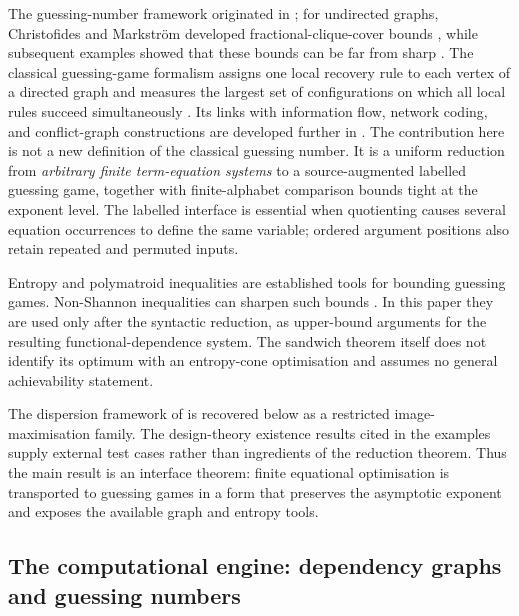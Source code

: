 \documentclass[11pt]{article}
\theoremstyle{plain}
\theoremstyle{definition}
\theoremstyle{definition}
\theoremstyle{remark}
\begin{document}
The guessing-number framework originated in \cite{riis2007information}; for undirected graphs,
Christofides and Markstr\"om developed fractional-clique-cover bounds \cite{christofides2011guessing}, while subsequent
examples showed that these bounds can be far from sharp \cite{cameron2016guessing,baber2016graph}.
The classical guessing-game formalism assigns one local recovery rule to each vertex of a directed graph and
measures the largest set of configurations on which all local rules succeed simultaneously
\cite{riis2006information}.  Its links with information flow, network coding, and conflict-graph constructions are
developed further in \cite{gadouleau2011graph}.  The contribution here is not a new definition of the classical
guessing number.  It is a uniform reduction from \emph{arbitrary finite term-equation systems} to a source-augmented
labelled guessing game, together with finite-alphabet comparison bounds tight at the exponent level.  The labelled
interface is essential when quotienting causes several equation occurrences to define the same variable; ordered
argument positions also retain repeated and permuted inputs.

Entropy and polymatroid inequalities are established tools for bounding guessing games.  Non-Shannon inequalities
can sharpen such bounds \cite{zhang1997non,baber2016graph}.  In this paper they are used only after the syntactic
reduction, as upper-bound arguments for the resulting functional-dependence system.  The sandwich theorem itself
does not identify its optimum with an entropy-cone optimisation and assumes no general achievability statement.

The dispersion framework of \cite{riis2019max} is recovered below as a restricted image-maximisation family.
The design-theory existence results cited in the examples supply external test cases rather than ingredients of the
reduction theorem.  Thus the main result is an interface theorem: finite equational optimisation is transported to
guessing games in a form that preserves the asymptotic exponent and exposes the available graph and entropy tools.

\subsection{The computational engine: dependency graphs and guessing numbers}
\end{document}
